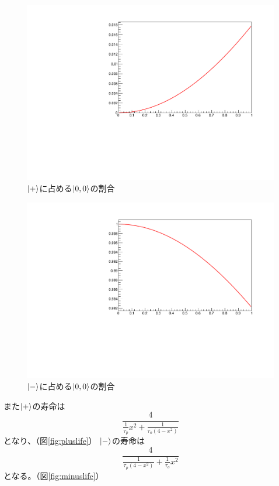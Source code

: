 \begin{figure}[H]
\centering
\includegraphics[keepaspectratio,angle=270,scale=0.6]{fig/ybm/plusstate.pdf}
\caption{$\ket{+}$に占める$\ket{0,0}$の割合}
\label{fig:plusstate}
\end{figure}

\begin{figure}[H]
\centering
\includegraphics[keepaspectratio,angle=270,scale=0.6]{fig/ybm/minusstate.pdf}
\caption{$\ket{-}$に占める$\ket{0,0}$の割合}
\label{fig:minusstate}
\end{figure}

また$\ket{+}$の寿命は
\begin{equation}
\frac{4}{\frac{1}{\tau_{p}}x^{2}+\frac{1}{\tau_{o}(4-x^{2})}}
\end{equation}
となり、（図\ref{fig:pluslife}）
$\ket{-}$の寿命は
\begin{equation}
\frac{4}{\frac{1}{\tau_{p}(4-x^{2})}+\frac{1}{\tau_{o}}x^{2}}
\end{equation}
となる。（図\ref{fig:minuslife}）

